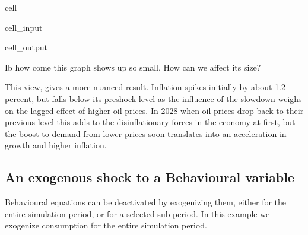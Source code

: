 \documentclass[letterpaper,10pt,english]{jupyterBook}
\begin{document}
\begin{sphinxuseclass}{cell}\begin{sphinxVerbatimInput}

\begin{sphinxuseclass}{cell_input}
\begin{sphinxVerbatim}[commandchars=\\\{\}]
\PYG{p}{[}\PYG{p}{]}
\end{sphinxVerbatim}

\end{sphinxuseclass}\end{sphinxVerbatimInput}
\begin{sphinxVerbatimOutput}

\begin{sphinxuseclass}{cell_output}
\noindent{}

\end{sphinxuseclass}\end{sphinxVerbatimOutput}

\end{sphinxuseclass}
\sphinxAtStartPar
 Ib how come this graph shows up so small.  How can we affect its size?

\sphinxAtStartPar
This view, gives a more nuanced result.  Inflation spikes initially by about 1.2 percent, but falls below its pre\sphinxhyphen{}shock level as the influence of the slowdown weighs on the lagged effect of higher oil prices. In 2028 when oil prices drop back to their previous level this adds to the dis\sphinxhyphen{}inflationary forces in the economy at first, but the boost to demand from lower prices soon translates into an acceleration in growth and higher inflation.


\subsection{An exogenous shock to a Behavioural variable}
\label{\detokenize{content/06_WBModels/LoadingWBModel:an-exogenous-shock-to-a-behavioural-variable}}
\sphinxAtStartPar
Behavioural equations can be de\sphinxhyphen{}activated by exogenizing them, either for the entire simulation period, or for a selected sub period.  In this example we exogenize consumption for the entire simulation period.
\end{document}
